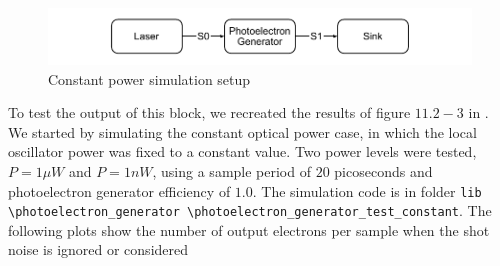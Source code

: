 \begin{refsection}
\begin{figure}[h]
	\centering
	\includegraphics{./lib/photoelectron_generator/figures/scheme_simulation_constant.pdf}
	\caption{Constant power simulation setup}
\end{figure}

To test the output of this block, we recreated the results of figure $11.2-3$ in \cite{saleh1991}.
We started by simulating the constant optical power case, in which the local oscillator power was fixed to a constant value.
Two power levels were tested, $P = 1 \mu W$ and $P = 1 nW$, using a sample period of $20$ picoseconds and photoelectron generator efficiency of $1.0$.
The simulation code is in folder \texttt{lib \textbackslash photoelectron\_generator \textbackslash photoelectron\_generator\_test\_constant}.
The following plots show the number of output electrons per sample when the shot noise is ignored or considered


\end{refsection}

